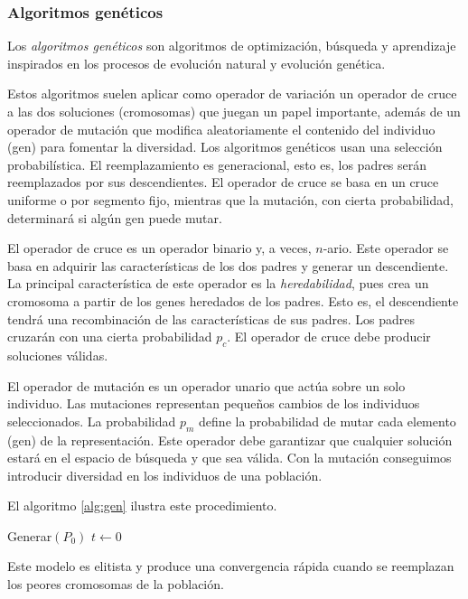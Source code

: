 \subsubsection{Algoritmos genéticos}

Los \emph{algoritmos genéticos} son algoritmos de optimización, búsqueda y aprendizaje inspirados en los procesos de evolución natural y evolución genética.

Estos algoritmos suelen aplicar como operador de variación un operador de cruce a las dos soluciones (cromosomas) que juegan un papel importante, además de un operador de mutación que modifica aleatoriamente el contenido del individuo (gen) para fomentar la diversidad. Los algoritmos genéticos usan una selección probabilística. El reemplazamiento es generacional, esto es, los padres serán reemplazados por sus descendientes. El operador de cruce se basa en un cruce uniforme o por segmento fijo, mientras que la mutación, con cierta probabilidad, determinará si algún gen puede mutar.

El operador de cruce es un operador binario y, a veces, $n$-ario. Este operador se basa en adquirir las características de los dos padres y generar un descendiente. La principal característica de este operador es la \emph{heredabilidad}, pues crea un cromosoma a partir de los genes heredados de los padres. Esto es, el descendiente tendrá una recombinación de las características de sus padres. Los padres cruzarán con una cierta probabilidad $p_c$. El operador de cruce debe producir soluciones válidas.

El operador de mutación es un operador unario que actúa sobre un solo individuo. Las mutaciones representan pequeños cambios de los individuos seleccionados. La probabilidad $p_m$ define la probabilidad de mutar cada elemento (gen) de la representación. Este operador debe garantizar que cualquier solución estará en el espacio de búsqueda y que sea válida. Con la mutación conseguimos introducir diversidad en los individuos de una población.

El algoritmo \ref{alg:gen} ilustra este procedimiento.

\begin{Ualgorithm}[H]
    \label{alg:gen}
    \small
    \DontPrintSemicolon
    Generar$(P_0)$ 
    $t \longleftarrow 0$\;
\end{Ualgorithm}

Este modelo es elitista y produce una convergencia rápida cuando se reemplazan los peores cromosomas de la población.

